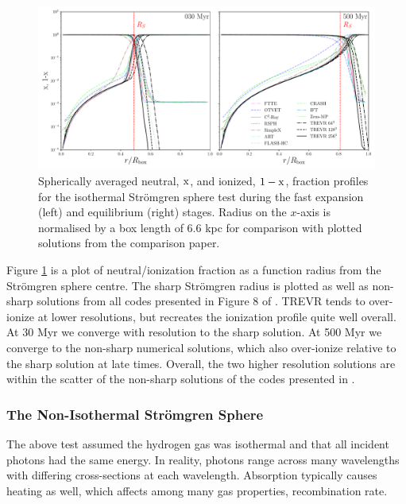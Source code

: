 \documentclass[fleq,usenatbib]{mnras}
\newcommand{\acro}{TREVR}
\newcommand{\strom}{Str\"omgren}
\begin{document}
{\begin{figure}
\includegraphics[width=0.95\linewidth]{Figures/strom_iso_fraction.pdf}
\caption{Spherically averaged neutral, $\rm x$, and ionized, $\rm 1-x$, 
fraction profiles for the isothermal \strom{} sphere test during the fast 
expansion (left) and equilibrium (right) stages. Radius on the $x$-axis is 
normalised by a box length of 6.6 kpc for comparison with plotted solutions 
from the \protect\cite{ilievEt06} comparison paper.}
\label{fig:stromiso}
\end{figure}
Figure \ref{fig:stromiso} is a plot of neutral/ionization fraction as a 
function radius from the \strom{} sphere centre. The sharp \strom{} radius is 
plotted as well as non-sharp solutions from all codes presented in Figure 8 
of \cite{ilievEt06}. \acro{} tends to over-ionize at lower resolutions, but 
recreates the ionization profile quite well overall. At 30 Myr we converge 
with resolution to the sharp solution. At 500 Myr we converge to the non-sharp 
numerical solutions, which also over-ionize relative to the sharp solution at 
late times. Overall, the two higher resolution solutions are within the 
scatter of the non-sharp solutions of the codes presented in \cite{ilievEt06}. 

\subsubsection{The Non-Isothermal \strom{} Sphere}
The above test assumed the hydrogen gas was isothermal and that all incident 
photons had the same energy. In reality, photons range across many wavelengths 
with differing cross-sections at each wavelength. Absorption typically causes 
heating as well, which affects among many gas properties, recombination rate.

}
\end{document}
